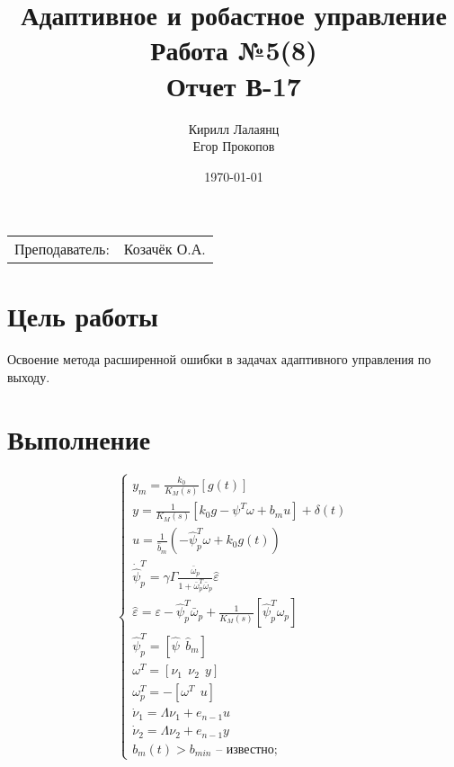 \documentclass{article}
\title{Адаптивное и робастное управление \\ Работа №5(8) \\ Отчет В-17} %
\author{Кирилл Лалаянц \\ Егор Прокопов} %
\date{\today} %
\begin{document}
\maketitle %

\begin{center}
\begin{tabular}{l r}
Преподаватель: & Козачёк О.А. %
\end{tabular}
\end{center}
\newpage

\section{Цель работы}

Освоение метода расширенной ошибки в задачах
адаптивного управления по выходу.

\section{Выполнение}
\[
\begin{cases}
    y_m = \frac{k_0}{K_M(s)}[g(t)] \\
    y = \frac{1}{K_M(s)}[k_0 g - \psi^T \omega + b_m u] + \delta(t) \\
    u = \frac{1}{\hat{b}_m}(-\hat{\psi}_p^T \omega + k_0 g(t)) \\
    \dot {\hat{\psi}}_p^T = \gamma \Gamma \frac{\bar \omega_p}{1 + \bar \omega_p^T \bar \omega_p} \hat \varepsilon\\
    \hat \varepsilon = \varepsilon - \hat{\psi}_p^T \bar \omega_p + \frac{1}{K_M(s)}[ \hat{\psi}_p^T \omega_p] \\
    \hat{\psi}_p^T = [\hat \psi ~~ \hat b_m] \\
    \omega^T = [\nu_1 ~~ \nu_2 ~~ y] \\
    \omega_p^T = -[\omega^T ~~ u] \\
    \dot \nu_1 = \Lambda \nu_1 + e_{n-1}u \\
    \dot \nu_2 = \Lambda \nu_2 + e_{n-1}y \\
    b_m(t) > b_{min} \text{ -- известно}; 
\end{cases}
\]
\end{document}
